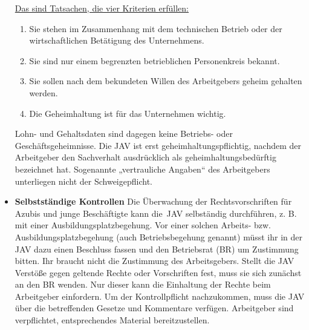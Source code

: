 \begin{itemize}
{	 	\underline{Das sind Tatsachen, die vier Kriterien erfüllen:} 
	 }
	\begin{enumerate}
		\item 
		Sie stehen im Zusammenhang mit dem technischen Betrieb oder der wirtschaftlichen Betätigung des Unternehmens.
		\item
		Sie sind nur einem begrenzten betrieblichen Personenkreis bekannt.
		\item
		Sie sollen nach dem bekundeten Willen des Arbeitgebers geheim gehalten werden.
		\item
		Die Geheimhaltung ist für das Unternehmen wichtig.
	\end{enumerate}
	Lohn- und Gehaltsdaten sind dagegen keine Betriebs- oder Geschäftsgeheimnisse.
	\newline 
	Die JAV ist erst geheimhaltungspflichtig, nachdem der Arbeitgeber den Sachverhalt ausdrücklich als geheimhaltungsbedürftig bezeichnet hat. Sogenannte „vertrauliche Angaben“ des Arbeitgebers unterliegen nicht der Schweigepflicht.
	\item 
	\textbf{Selbstständige Kontrollen}
	{
	Die Überwachung der Rechtsvorschriften für Azubis und junge Beschäftigte kann die JAV selbständig durchführen, z. B. mit einer Ausbildungsplatzbegehung.
	\newline
	Vor einer solchen Arbeits- bzw. Ausbildungsplatzbegehung (auch Betriebsbegehung genannt) müsst ihr in der JAV dazu einen Beschluss fassen und den Betriebsrat (BR) um Zustimmung bitten. Ihr braucht nicht die Zustimmung des Arbeitsgebers.
	\newline
	Stellt die JAV Verstöße gegen geltende Rechte oder Vorschriften fest, muss sie sich zunächst an den BR wenden. Nur dieser kann die Einhaltung der Rechte beim Arbeitgeber einfordern.
	\newline
	Um der Kontrollpflicht nachzukommen, muss die JAV über die betreffenden Gesetze und Kommentare verfügen. Arbeitgeber sind verpflichtet, entsprechendes Material bereitzustellen. 
	}
\end{itemize}

